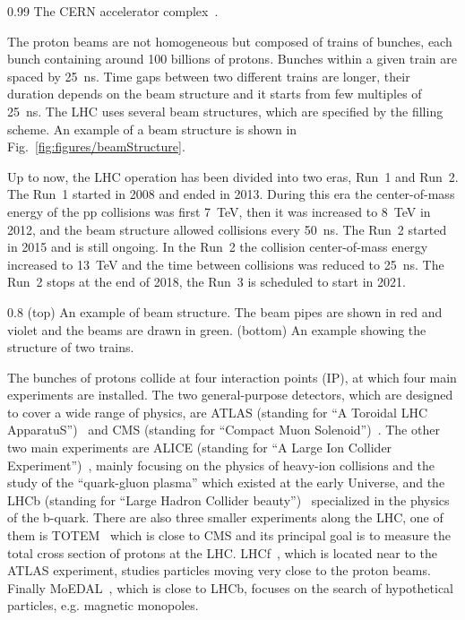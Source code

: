                  {0.99}       %
                 { The CERN accelerator complex~\cite{Mobs:2225847}. }

The proton beams are not homogeneous but composed of trains of bunches, each bunch containing around 100 billions of protons. Bunches within a given train are spaced by 25~ns. Time gaps between two different trains are longer, their duration depends on the beam structure and it starts from few multiples of 25~ns. The LHC uses several beam structures, which are specified by the filling scheme. An example of a beam structure is shown in Fig.~\ref{fig:figures/beamStructure}. 

Up to now, the LHC operation has been divided into two eras, Run~1 and Run~2. The Run~1 started in 2008 and ended in 2013. During this era the center-of-mass energy of the pp collisions was first 7~TeV, then it was increased to 8~TeV in 2012, and the beam structure allowed collisions every 50~ns. The Run~2 started in 2015 and is still ongoing. In the Run~2 the collision center-of-mass energy increased to 13~TeV and the time between collisions was reduced to 25~ns. The Run~2 stops at the end of 2018, the Run~3 is scheduled to start in 2021.

                 {0.8}       %
                 { (top) An example of beam structure. The beam pipes are shown in red and violet and the beams are drawn in green. (bottom) An example showing the structure of two trains. }

The bunches of protons collide at four interaction points (IP), at which four main experiments are installed. The two general-purpose detectors, which are designed to cover a wide range of physics, are ATLAS (standing for ``A Toroidal  LHC ApparatuS'')~\cite{Aad:2008zzm} and CMS (standing for ``Compact Muon Solenoid'')~\cite{Chatrchyan:2008aa}. The other two main experiments are ALICE (standing for ``A Large Ion Collider Experiment'')~\cite{Aamodt:2008zz}, mainly focusing on the physics of heavy-ion collisions and the study of the ``quark-gluon plasma'' which existed at the early Universe, and the LHCb (standing for ``Large Hadron Collider beauty'')~\cite{Alves:2008zz} specialized in the physics of the b-quark. There are also three smaller experiments along the LHC, one of them is TOTEM~\cite{Anelli:2008zza} which is close to CMS and its principal goal is to measure the total cross section of protons at the LHC. LHCf~\cite{Adriani:2008zz}, which is located near to the ATLAS experiment, studies particles moving very close to the proton beams. Finally MoEDAL~\cite{Acharya:2014nyr}, which is close to LHCb, focuses on the search of hypothetical particles, e.g. magnetic monopoles.

